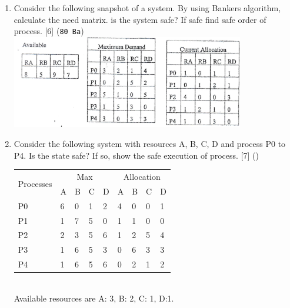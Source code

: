 \documentclass[12pt]{article}
\begin{document}
\begin{enumerate}
			\item Consider the following snapshot of a system. By using Bankers algorithm, calculate the need matrix. is the system safe? If safe find safe order of process. \hfill [6] (\texttt{80 Ba})\\
			\includegraphics[width=4in]{./pics/os_25}

			\item Consider the following system with resources A, B, C, D and process P0 to P4. Is the state safe? If so, show the safe execution of process. \hfill [7] ()\\
			\begin{tabular}{|p{17mm}|p{7mm}|p{7mm}|p{7mm}|p{7mm}||p{7mm}|p{7mm}|p{7mm}|p{7mm}|}
				\hline
				\multirow{2}{*}{Processes} & \multicolumn{4}{|c||}{Max} & \multicolumn{4}{|c|}{Allocation} \\ \cline{2-7}
				& A & B & C & D & A & B & C & D \\ \hline
				P0 & 6 & 0 & 1 & 2 & 4 & 0 & 0 & 1 \\ \hline
				P1 & 1 & 7 & 5 & 0 & 1 & 1 & 0 & 0 \\ \hline
				P2 & 2 & 3 & 5 & 6 & 1 & 2 & 5 & 4 \\ \hline
				P3 & 1 & 6 & 5 & 3 & 0 & 6 & 3 & 3 \\ \hline
				P4 & 1 & 6 & 5 & 6 & 0 & 2 & 1 & 2 \\ \hline
			\end{tabular}\\
			Available resources are A: 3, B: 2, C: 1, D:1.


\end{enumerate}
\end{document}
